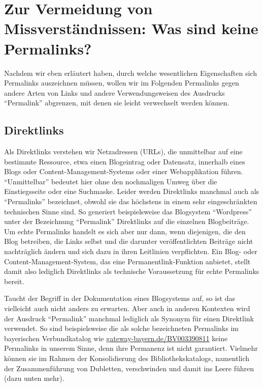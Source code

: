 \documentclass[12pt, a4paper]{article}
\begin{document}
\section{Zur Vermeidung von Missverständnissen: Was sind keine
  Permalinks?}
\label{zur-vermeidung-von-missverstaendnissen-was-sind-keine-permalinks}

Nachdem wir eben erläutert haben, durch welche wesentlichen
Eigenschaften sich Permalinks auszeichnen müssen, wollen wir im
Folgenden Permalinks gegen andere Arten von Links und andere
Verwendungsweisen des Ausdrucks "`Permalink"' abgrenzen, mit denen sie
leicht verwechselt werden können.

\subsection{Direktlinks}\label{direktlinks}

Als Direktlinks verstehen wir Netzadressen (URLs), die unmittelbar auf
eine bestimmte Ressource, etwa einen Blogeintrag oder Datensatz,
innerhalb eines Blogs oder Content-Management-Systems oder einer
Webapplikation führen. "`Unmittelbar"' bedeutet hier ohne den
nochmaligen Umweg über die Einstiegsseite oder eine Suchmaske. Leider
werden Direktlinks manchmal auch als "`Permalinks"' bezeichnet, obwohl
sie das höchstens in einem sehr eingeschränkten technischen Sinne
sind. So generiert beispielsweise das Blogsystem "`Wordpress"' unter
der Bezeichnung "`Permalink"' Direktlinks auf die einzelnen
Blogbeiträge. Um echte Permalinks handelt es sich aber nur dann, wenn
diejenigen, die den Blog betreiben, die Links selbst und die
darunter veröffentlichten Beiträge nicht nachträglich ändern und sich
dazu in ihren Leitlinien verpflichten. Ein Blog- oder
Content-Management-System, das eine Permanentlink-Funktion anbietet,
stellt damit also lediglich Direktlinks als technische Voraussetzung
für echte Permalinks bereit.

Taucht der Begriff in der Dokumentation eines Blogsystems auf, so ist
das vielleicht auch nicht anders zu erwarten. Aber auch in anderen
Kontexten wird der Ausdruck "`Permalink"' manchmal lediglich als
Synonym für einen Direktlink verwendet. So sind beispielsweise die als
solche bezeichneten Permalinks im bayerischen Verbundkatalog wie
\href{http://gateway-bayern.de/BV003390811}{gateway-bayern.\-de/\-BV003390811}
keine Permalinks in unserem Sinne, denn ihre Permanenz ist nicht
garantiert. Vielmehr können sie im Rahmen der Konsolidierung des
Bibliothekskatalogs, namentlich der Zusammenführung von Dubletten,
verschwinden und damit ins Leere führen (dazu unten mehr).
\end{document}
